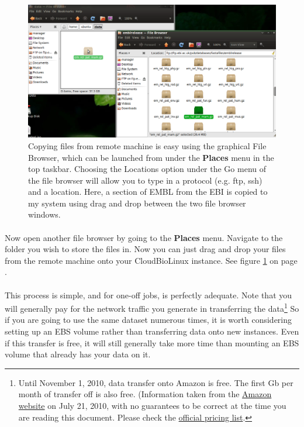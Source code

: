 \begin{figure}[!hd]
	\fbox
	{
		\begin{minipage}{13cm}
\includegraphics[width=\maxwidth]{"images/graphicalFTP_full"}
\caption[Drag and drop from remote machine]{\label{fig:graphicalftp}Copying files from remote machine is easy using the graphical File Browser, which can be launched from under the \textbf{Places} menu in the top taskbar. Choosing the Locations option under the Go menu of the file browser will allow you to type in a protocol (e.g. ftp, ssh) and a location. Here, a section of EMBL from the EBI is copied to my system using drag and drop between the two file browser windows.}
		\end{minipage}
	}
\end{figure}

\paragraph{}Now open another file browser by going to the \textbf{Places} menu. Navigate to the folder you wish to store the files in. Now you can just drag and drop your files from the remote machine onto your CloudBioLinux instance. See figure \ref{fig:graphicalftp} on page \pageref{fig:graphicalftp}.




\paragraph{}This process is simple, and for one-off jobs, is perfectly adequate. Note that you will generally pay for the network traffic you generate in transferring the data\footnote{Until November 1, 2010, data transfer onto Amazon is free. The first Gb per month of transfer off is also free. (Information taken from the \href{http://aws.amazon.com/ec2/pricing/}{Amazon website} on July 21, 2010, with no guarantees to be correct at the time you are reading this document. Please check the \href{http://aws.amazon.com/ec2/}{official pricing list}.} So if you are going to use the same dataset numerous times, it is worth considering setting up an EBS volume rather than transferring data onto new instances. Even if this transfer is free, it will still generally take more time than mounting an EBS volume that already has your data on it.

